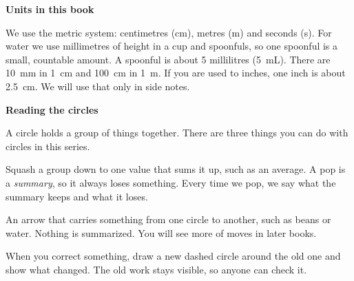 {\sans\bfseries\large\color{sky!70!black} Units in this book}\par
We use the metric system: centimetres (cm), metres (m) and seconds (s). For water we use millimetres of height in a cup and spoonfuls, so one spoonful is a small, countable amount. A spoonful is about 5 millilitres (5~mL).
There are 10~mm in 1~cm and 100~cm in 1~m. If you are used to inches, one inch is about 2.5~cm. We will use that only in side notes.
\clearpage

\thispagestyle{plain}\label{circlecard}
{\sans\bfseries\LARGE\color{ink} Reading the circles}\par\vspace{0.1cm}
A circle holds a group of things together. There are three things you can do with circles in this series.

\begin{center}
\end{center}

\begin{description}[leftmargin=0pt,itemsep=0.4em,style=unboxed]
\item[\textcolor{tomato}{\sans\bfseries Pop}] Squash a group down to one value that sums it up, such as an average. A pop is a \emph{summary}, so it always loses something. Every time we pop, we say what the summary keeps and what it loses.
\item[\textcolor{sky!70!black}{\sans\bfseries Move}] An arrow that carries something from one circle to another, such as beans or water. Nothing is summarized. You will see more of moves in later books.
\item[\textcolor{tangerine!80!black}{\sans\bfseries Wrap}] When you correct something, draw a new dashed circle around the old one and show what changed. The old work stays visible, so anyone can check it.
\end{description}

